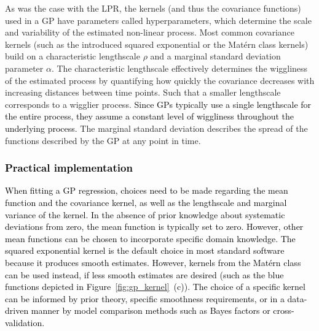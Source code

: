 \documentclass[man, floatsintext]{apa7}
\begin{document}
As was the case with the LPR, the kernels (and thus the covariance functions)
used in a GP have parameters called hyperparameters, which determine the scale
and variability of the estimated non-linear process. Most common covariance
kernels (such as the introduced squared exponential or the Matérn class
kernels) build on a characteristic lengthscale $\rho$ and a marginal standard
deviation parameter $\alpha$. The characteristic lengthscale effectively
determines the wiggliness of the estimated process by quantifying how quickly
the covariance decreases with increasing distances between time points. Such
that a smaller lengthscale corresponds to a wigglier process.
\textcolor{black}{Since GPs typically use a single lengthscale for the entire
  process, they assume a constant level of wiggliness throughout
  the underlying process.}
The marginal standard deviation describes the spread of the functions described
by the GP at any point in time.

\subsubsection{\textcolor{black}{Practical implementation}}

\textcolor{black}{
  When fitting a GP regression, choices need to be made regarding the mean
  function and the covariance kernel, as well as the lengthscale and marginal
  variance of the kernel. In the absence of prior knowledge about systematic
  deviations from zero, the mean function is typically set to zero. However,
  other mean functions can be chosen to incorporate specific domain knowledge.
  The squared exponential kernel is the default choice in most standard
  software because it produces smooth estimates. However, kernels from the
  Matérn class can be used instead, if less smooth estimates are desired (such
  as the blue functions depicted in Figure~\ref{fig:gp_kernel}~(c)). The choice
  of a specific kernel can be informed by prior theory, specific smoothness
  requirements, or in a data-driven manner by model comparison methods such as
  Bayes factors or cross-validation.
}
\end{document}
